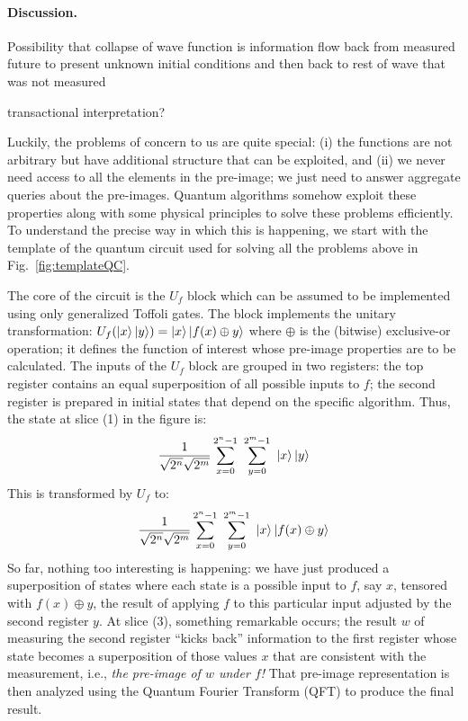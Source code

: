 \documentclass{article}
\begin{document}
\begin{refsection}
\paragraph*{Discussion.}
Possibility that collapse of wave function is information flow back
from measured future to present unknown initial conditions and then
back to rest of wave that was not measured

transactional interpretation?

Luckily, the problems of concern to us are quite special: (i) the
functions are not arbitrary but have additional structure that can be
exploited, and (ii) we never need access to all the elements in the
pre-image; we just need to answer aggregate queries about the
pre-images. Quantum algorithms somehow exploit these properties along
with some physical principles to solve these problems efficiently. To
understand the precise way in which this is happening, we start with
the template of the quantum circuit used for solving all the problems
above in Fig.~\ref{fig:templateQC}.

The core of the circuit is the $U_f$ block which can be assumed to be
implemented using only generalized Toffoli gates. The block implements
the unitary transformation: $U_f(\ket{x}\ket{y}) = \ket{x}\ket{f(x)
  \oplus y}$ where $\oplus$ is the (bitwise) exclusive-or operation;
it defines the function of interest whose pre-image properties are to
be calculated. The inputs of the $U_f$ block are grouped in two
registers: the top register contains an equal superposition of all
possible inputs to $f$; the second register is prepared in initial
states that depend on the specific algorithm. Thus, the state at slice
(1) in the figure is:
  \[
  \frac{1}{\sqrt{2^n}\sqrt{2^m}}\sum_{x=0}^{2^n-1} ~\sum_{y=0}^{2^m-1} ~\ket{x}\ket{y}
  \]
This is transformed by $U_f$ to:
  \[
  \frac{1}{\sqrt{2^n}\sqrt{2^m}}
  \sum_{x=0}^{2^n-1} ~\sum_{y=0}^{2^m-1} ~\ket{x}\ket{f(x)\oplus y}
  \]
So far, nothing too interesting is happening: we have just produced a
superposition of states where each state is a possible input to $f$,
say $x$, tensored with $f(x) \oplus y$, the result of applying $f$ to
this particular input adjusted by the second register $y$. At slice
(3), something remarkable occurs; the result $w$ of measuring the
second register ``kicks back'' information to the first register whose
state becomes a superposition of those values $x$ that are consistent
with the measurement, i.e., \emph{the pre-image of $w$ under $f$!}
That pre-image representation is then analyzed using the Quantum
Fourier Transform (QFT) to produce the final result.


\end{refsection}
\end{document}
